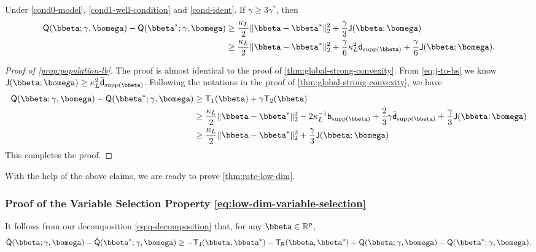 \documentclass[10pt]{article}
\numberwithin{equation}{section}
\newcommand*{\supp}{\mathrm{supp}}
\begin{document}
\begin{proposition}
\label{prop:population-lb}
    Under \cref{cond0-model}, \ref{cond1-well-condition} and \ref{cond-ident}. If $\gamma \ge 3\gamma^*$, then
    \begin{align*}
        \mathsf{Q}(\bbeta;\gamma,\bomega) - \mathsf{Q}(\bbeta^*;\gamma,\bomega) &\ge \frac{\kappa_L}{2} \|\bbeta - \bbeta^*\|_2^2 + \frac{\gamma}{3} \mathsf{J}(\bbeta;\bomega) \\
        &\ge \frac{\kappa_L}{2} \|\bbeta - \bbeta^*\|_2^2 + \frac{\gamma}{6} \kappa_L^2 \bar{\mathsf{d}}_{\supp(\bbeta)} + \frac{\gamma}{6} \mathsf{J}(\bbeta;\bomega).
    \end{align*}
\end{proposition}
\begin{proof}[Proof of \cref{prop:population-lb}] The proof is almost identical to the proof of \cref{thm:global-strong-convexity}. From \eqref{eq:j-to-bs} we know $\mathsf{J}(\bbeta;\bomega) \ge \kappa_L^2\bar{\mathsf{d}}_{\supp(\bbeta)}$. Following the notations in the proof of \cref{thm:global-strong-convexity}, we have
\begin{align*}
    \mathsf{Q}(\bbeta;\gamma,\bomega) - \mathsf{Q}(\bbeta^*;\gamma,\bomega) &\ge \mathsf{T}_1(\bbeta) + \gamma \mathsf{T}_2(\bbeta) \\
    &\ge \frac{\kappa_L}{2} \|\bbeta-\bbeta^*\|_2^2 - 2 \kappa_L^{-1} \mathsf{b}_{\supp(\bbeta)} + \frac{2}{3} \gamma \bar{\mathsf{d}}_{\supp(\bbeta)} + \frac{\gamma}{3} \mathsf{J}(\bbeta;\bomega)\\
    &\ge \frac{\kappa_L}{2} \|\bbeta-\bbeta^*\|_2^2 + \frac{\gamma}{3} \mathsf{J}(\bbeta;\bomega)
\end{align*} This completes the proof.
\end{proof}

With the help of the above claims, we are ready to prove \cref{thm:rate-low-dim}.

\subsubsection{Proof of the Variable Selection Property \eqref{eq:low-dim-variable-selection}}

It follows from our decomposition \eqref{eq:q-decomposition} that, for any $\bbeta \in \mathbb{R}^p$,
\begin{align}
\label{eq:low-dim-variable-selection-pf1}
    \hat{\mathsf{Q}}(\bbeta;\gamma, \bomega) - \hat{\mathsf{Q}}(\bbeta^*;\gamma, \bomega)
    \ge - \mathsf{T}_{\mathsf{J}}(\bbeta, \bbeta^*) - \mathsf{T}_{\mathsf{R}}(\bbeta, \bbeta^*) + \mathsf{Q}(\bbeta; \gamma, \bomega) - \mathsf{Q}(\bbeta^*; \gamma, \bomega).
\end{align}
\end{document}
